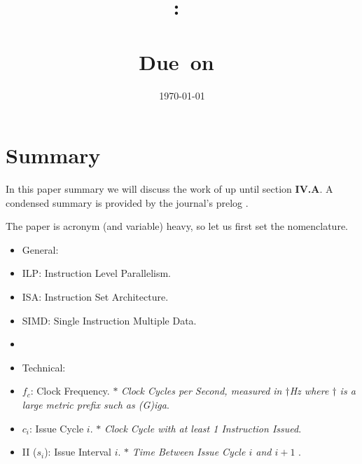 \documentclass{article}
\title{
    \vspace{2in}
    \textmd{\textbf{\hmwkClass:\ \\ \hmwkTitle}}\\
    \normalsize\vspace{0.1in}\small{Due\ on\ \hmwkDueDate}\\
    \vspace{0.1in}\Large{\textit{\paprTitle}}
    \vspace{3in}
}
\author{\hmwkAuthorName}
\date{\today}
\begin{document}
\maketitle

\pagebreak



\section{Summary}

In this paper summary we will discuss the work of \cite{Sima}
up until section \textbf{IV.A}.
A condensed summary is provided by the journal's prelog \cite{Falk}.

The paper is acronym (and variable) heavy, so let us first set the nomenclature.

\begin{itemize}
    \item[] General:
    \item ILP: Instruction Level Parallelism.
    \item ISA: Instruction Set Architecture.
    \item SIMD: Single Instruction Multiple Data.
    \item[] \dotfill
    \item[] Technical:
    \item \(f_{c}\): Clock Frequency.
    \subitem \(\ast\) \emph{Clock Cycles per Second, measured in \(\dagger\)Hz where \(\dagger\) is a large metric prefix such as (G)iga}.
    \item \(c_{i}\): Issue Cycle \(i\).
    \subitem \(\ast\) \emph{Clock Cycle with at least 1 Instruction Issued}.
    \item II (\(s_{i}\)): Issue Interval \(i\).
    \subitem \(\ast\) \emph{Time Between Issue Cycle \(i\) and \(i+1\) }.

\end{itemize}
\end{document}
